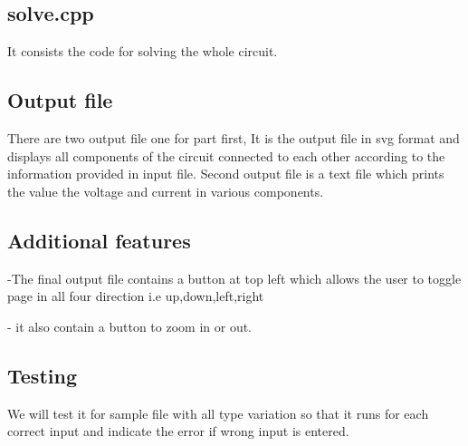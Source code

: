 \documentclass{report}
\begin{document}
\subsection{solve.cpp}

It consists the code for solving the whole circuit.
\subsection{Output file}

There are two output file one for part first, It is the output file in svg format and displays all components of the circuit connected to each other according to the information provided in input file.
Second output file is a text file which prints the value the voltage and current in various components. 
\subsection{Additional features}

-The final output file contains a button at top left which allows the user
 to toggle page in all four direction i.e up,down,left,right
 
 - it also contain a button to zoom in or out.

\subsection{Testing}


We will test it for sample file with all type variation so that it runs for each correct input and indicate the error if wrong input is entered.
\end{document}
